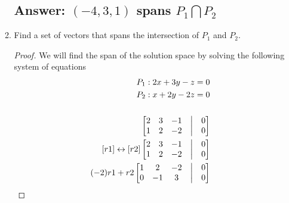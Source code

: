 \documentclass[12pt]{article}
\begin{document}
\begin{enumerate}
\begin{enumerate}
                            \subsection{Answer: ${(-4, 3, 1)}$ spans $P_1 \bigcap P_2$}
                      \item Find a set of vectors that spans the intersection of $P_1$ and $P_2$.
                            \begin{proof}
                                    We will find the span of the solution space by solving the following system of equations
                                    \begin{align*}
                                            P_{1}: 2x+3y-z = 0         \\
                                            P_{2}: x+2y-2z = 0         \\\\
                                            \begin{bmatrix}
                                                    2 & 3 & -1 & \bigm| & 0 \\
                                                    1 & 2 & -2 & \bigm| & 0 \\
                                            \end{bmatrix}
                                            \\
                                            [r1] \leftrightarrow  [r2]
                                            \begin{bmatrix}
                                                    2 & 3 & -1 & \bigm| & 0 \\
                                                    1 & 2 & -2 & \bigm| & 0 \\
                                            \end{bmatrix}
                                            \\
                                            (-2)r1+r2
                                            \begin{bmatrix}
                                                    1 & 2  & -2 & \bigm| & 0 \\
                                                    0 & -1 & 3  & \bigm| & 0 \\
                                            \end{bmatrix}
                                            \\

\end{align*}
\end{proof}
\end{enumerate}
\end{enumerate}
\end{document}
